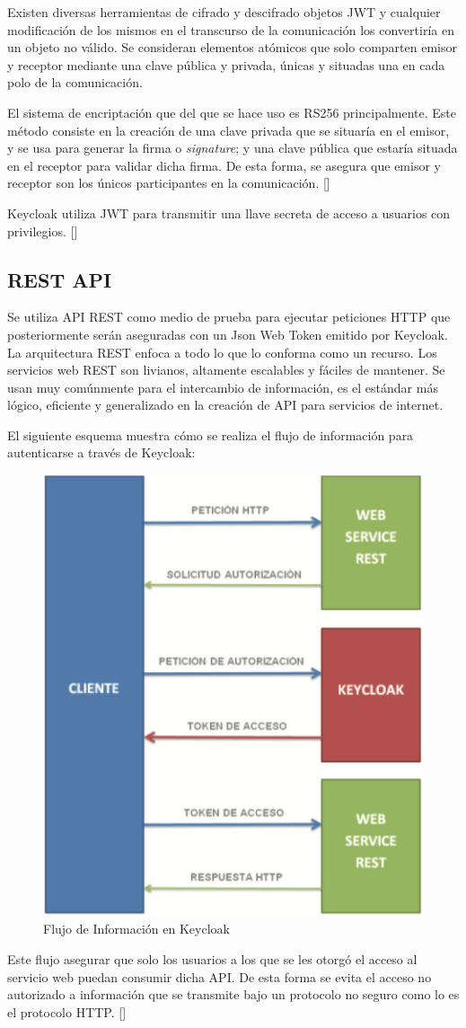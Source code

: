 Existen diversas herramientas de cifrado y descifrado objetos JWT y cualquier modificación de los mismos en el transcurso de la comunicación los convertiría en un objeto no válido. Se consideran elementos atómicos que solo comparten emisor y receptor mediante una clave pública y privada, únicas y situadas una en cada polo de la comunicación. 

El sistema de encriptación que del que se hace uso es RS256 principalmente. Este método consiste en la creación de una clave privada que se situaría en el emisor, y se usa para generar la firma o \textit{signature}; y una clave pública que estaría situada en el receptor para validar dicha firma. De esta forma, se asegura que emisor y receptor son los únicos participantes en la comunicación. [\cite{lobato2022regulacion}]

 Keycloak utiliza JWT para transmitir una llave secreta de acceso a usuarios con privilegios. [\cite{muyon2020metodos}]


\subsection*{REST API}
Se utiliza API REST como medio de prueba para ejecutar peticiones HTTP que posteriormente serán aseguradas con un Json Web Token emitido por Keycloak. La arquitectura REST enfoca a todo lo que lo conforma como un recurso. Los servicios web REST son livianos, altamente escalables y fáciles de mantener. Se usan muy comúnmente para el intercambio de información, es el estándar más lógico, eficiente y generalizado en la creación de API para servicios de internet.

El siguiente esquema muestra cómo se realiza el flujo de información para autenticarse a través de Keycloak:

\begin{figure}[H]
	\centering
	\includegraphics[width=0.7\linewidth]{Graphics/keycloak_info_flux}
	\caption{Flujo de Información en Keycloak}
	\label{fig:Flujo de Información en Keycloak}
\end{figure}

Este flujo asegurar que solo los usuarios a los que se les otorgó el acceso al servicio web puedan consumir dicha API. De esta forma se evita el acceso no autorizado a información que se transmite bajo un protocolo no seguro como lo es el protocolo HTTP. [\cite{muyon2020metodos}]
